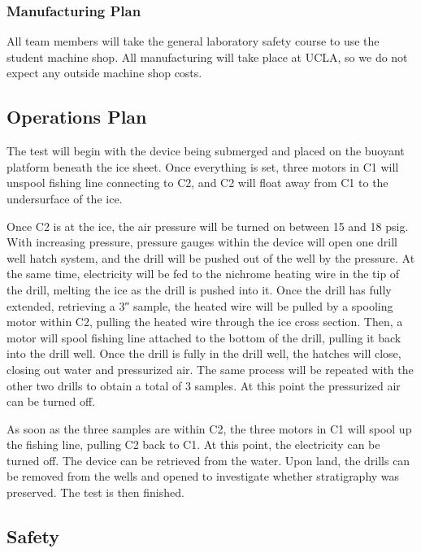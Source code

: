 \documentclass{article}
\begin{document}
\subsubsection{Manufacturing Plan}

All team members will take the general laboratory safety course to use the student machine shop. All manufacturing will take place at UCLA, so we do not expect any outside machine shop costs.

\subsection{Operations Plan}

The test will begin with the device being submerged and placed on the buoyant platform beneath the ice sheet. Once everything is set, three motors in C1 will unspool fishing line connecting to C2, and C2 will float away from C1 to the undersurface of the ice. 

Once C2 is at the ice, the air pressure will be turned on between 15 and 18 psig. With increasing pressure, pressure gauges within the device will open one drill well hatch system, and the drill will be pushed out of the well by the pressure. At the same time, electricity will be fed to the nichrome heating wire in the tip of the drill, melting the ice as the drill is pushed into it. Once the drill has fully extended, retrieving a 3″ sample, the heated wire will be pulled by a spooling motor within C2, pulling the heated wire through the ice cross section. Then, a motor will spool fishing line attached to the bottom of the drill, pulling it back into the drill well. Once the drill is fully in the drill well, the hatches will close, closing out water and pressurized air. The same process will be repeated with the other two drills to obtain a total of 3 samples. At this point the pressurized air can be turned off.

As soon as the three samples are within C2, the three motors in C1 will spool up the fishing line, pulling C2 back to C1. At this point, the electricity can be turned off. The device can be retrieved from the water. Upon land, the drills can be removed from the wells and opened to investigate whether stratigraphy was preserved. The test is then finished.

\subsection{Safety}
\end{document}
